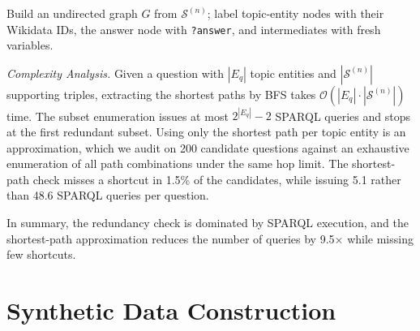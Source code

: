 \begin{algorithm}[t]
\small
\caption{Redundancy Check}
\label{alg:redcheck}

Build an undirected graph \(G\) from \(\mathcal{S}^{(n)}\); label topic-entity nodes with their Wikidata IDs, the answer node with \texttt{?answer}, and intermediates with fresh variables.\par



\end{algorithm}

\textit{Complexity Analysis.}
Given a question with $|E_q|$ topic entities and $|\mathcal{S}^{(n)}|$ supporting triples, extracting the shortest paths by BFS takes $\mathcal{O}(|E_q|\cdot|\mathcal{S}^{(n)}|)$ time. The subset enumeration issues at most $2^{|E_q|}-2$ SPARQL queries and stops at the first redundant subset. Using only the shortest path per topic entity is an approximation, which we audit on 200 candidate questions against an exhaustive enumeration of all path combinations under the same hop limit. The shortest-path check misses a shortcut in 1.5\% of the candidates, while issuing 5.1 rather than 48.6 SPARQL queries per question.

In summary, the redundancy check is dominated by SPARQL execution, and the shortest-path approximation reduces the number of queries by 9.5$\times$ while missing few shortcuts.

\section{Synthetic Data Construction}
\label{app:data}

